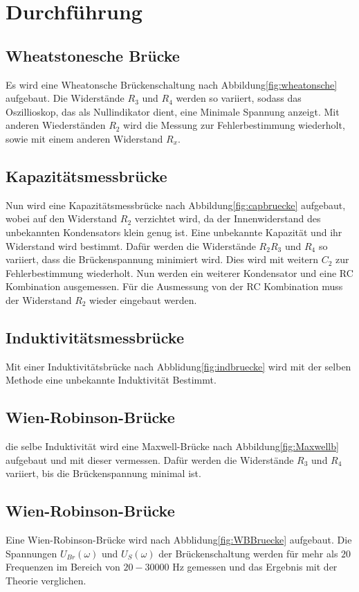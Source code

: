 \section{Durchführung}
\label{sec:Durchführung}
\subsection{Wheatstonesche Brücke}
Es wird eine Wheatonsche Brückenschaltung nach Abbildung\ref{fig:wheatonsche}
aufgebaut. Die Widerstände $R_3$ und $R_4$ werden so variiert, sodass das
Oszillioskop, das als Nullindikator dient, eine Minimale Spannung anzeigt.
Mit anderen Wiederständen $R_2$ wird die Messung zur Fehlerbestimmung wiederholt,
sowie mit einem anderen Widerstand $R_x$.
\subsection{Kapazitätsmessbrücke}
Nun wird eine Kapazitätsmessbrücke nach Abbildung\ref{fig:capbruecke} aufgebaut,
wobei auf den Widerstand $R_2$ verzichtet wird, da der Innenwiderstand des
unbekannten Kondensators klein genug ist.
Eine unbekannte Kapazität und ihr Widerstand wird bestimmt. Dafür werden die
Widerstände $R_2R_3$ und $R_4$ so variiert, dass die Brückenspannung minimiert
wird. Dies wird mit weitern $C_2$ zur Fehlerbestimmung wiederholt. Nun werden
ein weiterer Kondensator und eine RC Kombination ausgemessen. Für die Ausmessung
von der RC Kombination muss der Widerstand $R_2$ wieder eingebaut werden.
\subsection{Induktivitätsmessbrücke}
Mit einer Induktivitätsbrücke nach Abblidung\ref{fig:indbruecke} wird mit der
selben Methode eine unbekannte Induktivität Bestimmt.
\subsection{Wien-Robinson-Brücke}
die selbe Induktivität wird eine Maxwell-Brücke nach Abbildung\ref{fig:Maxwellb}
aufgebaut und mit dieser vermessen. Dafür werden die Widerstände $R_3$ und $R_4$
variiert, bis die Brückenspannung minimal ist.
\subsection{Wien-Robinson-Brücke}
Eine Wien-Robinson-Brücke wird nach Abblidung\ref{fig:WBBruecke} aufgebaut. Die
Spannungen $U_{Br}(\omega)$ und $U_{S}(\omega)$ der Brückenschaltung werden für
mehr als $20$ Frequenzen im Bereich von $20-30000$ Hz gemessen und das Ergebnis
mit der Theorie verglichen.
